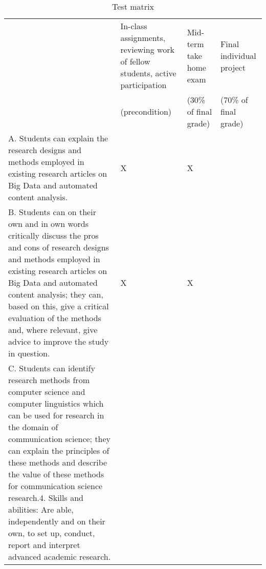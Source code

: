 \documentclass[a4paper,12pt]{report}
\begin{document}
\begin{table}[]
\footnotesize{
\centering
\caption{Test matrix}
\label{testmatrix}
\begin{tabular}{p{8cm}p{2cm}p{2cm}p{2cm}}
                                                                                                                                                                                                                                                                                                                                                                                            & In-class assignments, reviewing work of fellow students, active participation  
& Mid-term take home exam 
& Final individual project \\
                                                                                                                                                                                                                                                                                                                                                                                                                   &  (precondition)                                                                                            & (30\% of final grade)   & (70\% of final grade)    \\
A. Students can explain the research designs and methods employed in existing research articles on Big Data and automated content analysis.                                                                                                                                                                                                                      & X                                                                                            & X                       &                          \\
B. Students can on their own and in own words critically discuss the pros and cons of research designs and methods employed in existing research articles on Big Data and automated content analysis; they can, based on this, give a critical evaluation of the methods and, where relevant, give advice to improve the study in question.
& X                                                                                            & X                       &                          \\
C. Students can identify research methods from computer science and computer linguistics which can be used for research in the domain of communication science; they can explain the principles of these methods and describe the value of these methods for communication science research.4. Skills and abilities: Are able, independently and on their own, to set up, conduct, report and interpret advanced academic research.

\end{tabular}}
\end{table}
\end{document}
